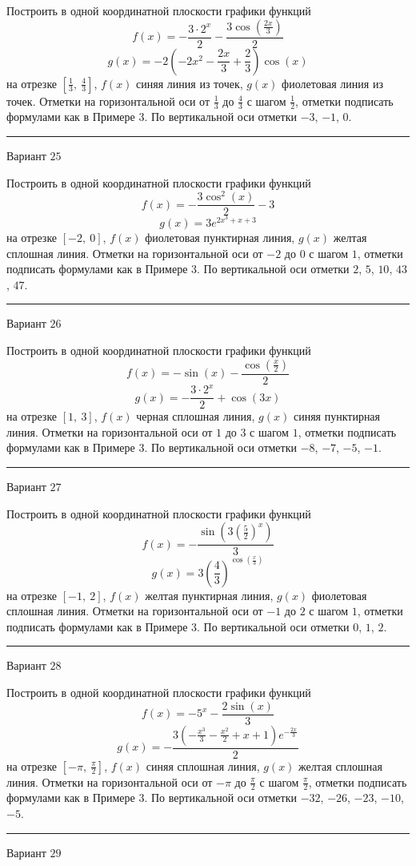 \documentclass[11pt]{report}
\begin{document}
Построить в одной координатной плоскости графики функций $$f(x) = - \frac{3 \cdot 2^{x}}{2} - \frac{3 \cos{\left(\frac{2 x}{3} \right)}}{2}$$ $$g(x) = - 2 \left(- 2 x^{2} - \frac{2 x}{3} + \frac{2}{3}\right) \cos{\left(x \right)}$$ на отрезке $\left[\frac{1}{3}, \  \frac{4}{3}\right]$, $f(x)$ синяя линия из точек, $g(x)$ фиолетовая линия из точек. Отметки на горизонтальной оси от $\frac{1}{3}$ до $\frac{4}{3}$ с шагом $\frac{1}{2}$, отметки подписать формулами как в Примере 3. По вертикальной оси отметки $-3$, $-1$, $0$.
\begin{center}
\noindent\rule{8cm}{0.4pt}
\end{center}
Вариант $25$


Построить в одной координатной плоскости графики функций $$f(x) = - \frac{3 \cos^{2}{\left(x \right)}}{2} - 3$$ $$g(x) = 3 e^{2 x^{3} + x + 3}$$ на отрезке $\left[-2, \  0\right]$, $f(x)$ фиолетовая пунктирная линия, $g(x)$ желтая сплошная линия. Отметки на горизонтальной оси от $-2$ до $0$ с шагом $1$, отметки подписать формулами как в Примере 3. По вертикальной оси отметки $2$, $5$, $10$, $43$, $47$.
\begin{center}
\noindent\rule{8cm}{0.4pt}
\end{center}
Вариант $26$


Построить в одной координатной плоскости графики функций $$f(x) = - \sin{\left(x \right)} - \frac{\cos{\left(\frac{x}{2} \right)}}{2}$$ $$g(x) = - \frac{3 \cdot 2^{x}}{2} + \cos{\left(3 x \right)}$$ на отрезке $\left[1, \  3\right]$, $f(x)$ черная сплошная линия, $g(x)$ синяя пунктирная линия. Отметки на горизонтальной оси от $1$ до $3$ с шагом $1$, отметки подписать формулами как в Примере 3. По вертикальной оси отметки $-8$, $-7$, $-5$, $-1$.
\begin{center}
\noindent\rule{8cm}{0.4pt}
\end{center}
Вариант $27$


Построить в одной координатной плоскости графики функций $$f(x) = - \frac{\sin{\left(3 \left(\frac{5}{2}\right)^{x} \right)}}{3}$$ $$g(x) = 3 \left(\frac{4}{3}\right)^{\cos{\left(\frac{x}{3} \right)}}$$ на отрезке $\left[-1, \  2\right]$, $f(x)$ желтая пунктирная линия, $g(x)$ фиолетовая сплошная линия. Отметки на горизонтальной оси от $-1$ до $2$ с шагом $1$, отметки подписать формулами как в Примере 3. По вертикальной оси отметки $0$, $1$, $2$.
\begin{center}
\noindent\rule{8cm}{0.4pt}
\end{center}
Вариант $28$


Построить в одной координатной плоскости графики функций $$f(x) = - 5^{x} - \frac{2 \sin{\left(x \right)}}{3}$$ $$g(x) = - \frac{3 \left(- \frac{x^{3}}{3} - \frac{x^{2}}{2} + x + 1\right) e^{- \frac{2 x}{3}}}{2}$$ на отрезке $\left[- \pi, \  \frac{\pi}{2}\right]$, $f(x)$ синяя сплошная линия, $g(x)$ желтая сплошная линия. Отметки на горизонтальной оси от $- \pi$ до $\frac{\pi}{2}$ с шагом $\frac{\pi}{2}$, отметки подписать формулами как в Примере 3. По вертикальной оси отметки $-32$, $-26$, $-23$, $-10$, $-5$.
\begin{center}
\noindent\rule{8cm}{0.4pt}
\end{center}
Вариант $29$
\end{document}
